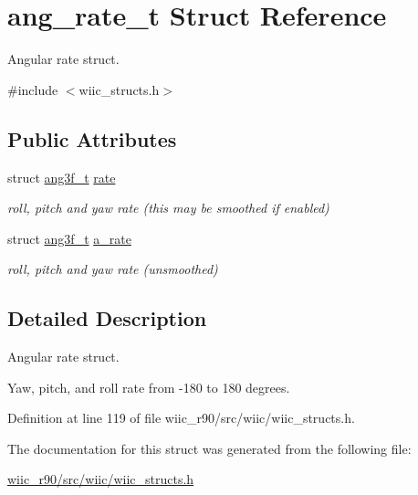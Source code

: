 \hypertarget{structang__rate__t}{\section{ang\-\_\-rate\-\_\-t Struct Reference}
\label{structang__rate__t}
}


Angular rate struct.  




{\ttfamily \#include $<$wiic\-\_\-structs.\-h$>$}

\subsection*{Public Attributes}
\begin{DoxyCompactItemize}
\item 
\hypertarget{structang__rate__t_aa1fa5093d421095a2eeae1ad07b341eb}{struct \hyperlink{structang3f__t}{ang3f\-\_\-t} \hyperlink{structang__rate__t_aa1fa5093d421095a2eeae1ad07b341eb}{rate}}\label{structang__rate__t_aa1fa5093d421095a2eeae1ad07b341eb}

\begin{DoxyCompactList}\small\item\em roll, pitch and yaw rate (this may be smoothed if enabled) \end{DoxyCompactList}\item 
\hypertarget{structang__rate__t_a255841f280d6b3e0bc07549ccabb9a4c}{struct \hyperlink{structang3f__t}{ang3f\-\_\-t} \hyperlink{structang__rate__t_a255841f280d6b3e0bc07549ccabb9a4c}{a\-\_\-rate}}\label{structang__rate__t_a255841f280d6b3e0bc07549ccabb9a4c}

\begin{DoxyCompactList}\small\item\em roll, pitch and yaw rate (unsmoothed) \end{DoxyCompactList}\end{DoxyCompactItemize}


\subsection{Detailed Description}
Angular rate struct. 

Yaw, pitch, and roll rate from -\/180 to 180 degrees. 

Definition at line 119 of file wiic\-\_\-r90/src/wiic/wiic\-\_\-structs.\-h.



The documentation for this struct was generated from the following file\-:\begin{DoxyCompactItemize}
\item 
\hyperlink{wiic__r90_2src_2wiic_2wiic__structs_8h}{wiic\-\_\-r90/src/wiic/wiic\-\_\-structs.\-h}\end{DoxyCompactItemize}
